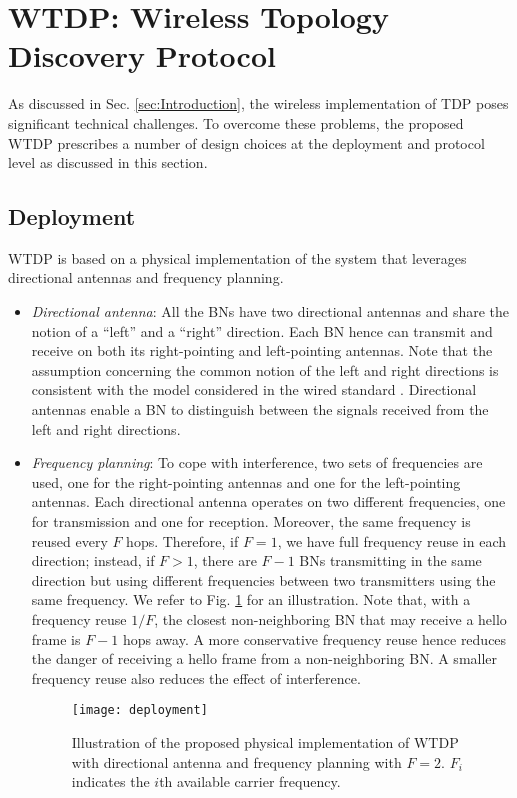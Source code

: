 \documentclass[10pt,english,two column]{IEEEtran}
\begin{document}
\section{WTDP: Wireless Topology Discovery Protocol\label{sec:Proposed-Inauguration-Scheme}}

As discussed in Sec. \ref{sec:Introduction}, the wireless implementation
of TDP poses significant technical challenges. To overcome these problems,
the proposed WTDP prescribes a number of design choices at the deployment
and protocol level as discussed in this section. 


\subsection{Deployment\label{sub:Deployment}}

WTDP is based on a physical implementation of the system that leverages
directional antennas and frequency planning.
\begin{itemize}
\item \textit{Directional antenna}: All the BNs have two directional antennas
and share the notion of a ``left'' and a ``right'' direction.
Each BN hence can transmit and receive on both its right-pointing
and left-pointing antennas. Note that the assumption concerning the
common notion of the left and right directions is consistent with
the model considered in the wired standard \cite{IEC 61375}. Directional
antennas enable a BN to distinguish between the signals received from
the left and right directions. 
\item \textit{Frequency planning}: To cope with interference, two sets of
frequencies are used, one for the right-pointing antennas and one
for the left-pointing antennas. Each directional antenna operates
on two different frequencies, one for transmission and one for reception.
Moreover, the same frequency is reused every $F$ hops. Therefore,
if $F=1$, we have full frequency reuse in each direction; instead,
if $F>1$, there are $F-1$ BNs transmitting in the same direction
but using different frequencies between two transmitters using the
same frequency. We refer to Fig. \ref{fig:Deployment} for an illustration.
Note that, with a frequency reuse $1/F$, the closest non-neighboring
BN that may receive a hello frame is $F-1$ hops away. A more conservative
frequency reuse hence reduces the danger of receiving a hello frame
from a non-neighboring BN. A smaller frequency reuse also reduces
the effect of interference.
\begin{figure}[htbp]
\begin{centering}
\textsf{\texttt{[image: deployment]}}
\par\end{centering}

\caption{\label{fig:Deployment}Illustration of the proposed physical implementation
of WTDP with directional antenna and frequency planning with $F=2$.
$F_{i}$ indicates the $i$th available carrier frequency.}
\end{figure}

\end{itemize}
\end{document}
